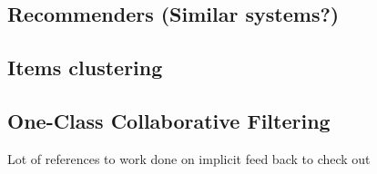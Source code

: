 


\subsection{Recommenders (Similar systems?)}
\subsection{Items clustering}
\subsection{One-Class Collaborative Filtering}










Lot of references to work done on implicit feed back to check out




